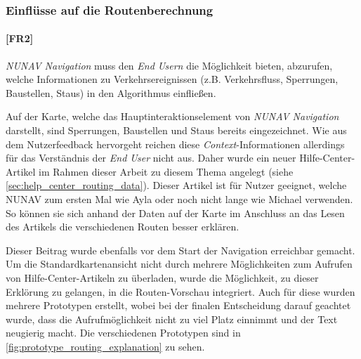 \subsubsection{Einflüsse auf die Routenberechnung}
\label{sec:route_explanation_definition}

\paragraph{[FR2]} \textit{NUNAV Navigation} muss den \textit{End Usern} die Möglichkeit bieten, abzurufen, welche Informationen zu Verkehrsereignissen (z.B. Verkehrsfluss, Sperrungen, Baustellen, Staus) in den Algorithmus einfließen.

\bigskip

Auf der Karte, welche das Hauptinteraktionselement von \textit{NUNAV Navigation} darstellt, sind Sperrungen, Baustellen und Staus bereits eingezeichnet. Wie aus dem Nutzerfeedback hervorgeht reichen diese \textit{Context}-Informationen allerdings für das Verständnis der \textit{End User} nicht aus. Daher wurde ein neuer Hilfe-Center-Artikel im Rahmen dieser Arbeit zu diesem Thema angelegt (siehe \autoref{sec:help_center_routing_data}). Dieser Artikel ist für Nutzer geeignet, welche NUNAV zum ersten Mal wie Ayla oder noch nicht lange wie Michael verwenden. So können sie sich anhand der Daten auf der Karte im Anschluss an das Lesen des Artikels die verschiedenen Routen besser erklären.

Dieser Beitrag wurde ebenfalls vor dem Start der Navigation erreichbar gemacht. Um die Standardkartenansicht nicht durch mehrere Möglichkeiten zum Aufrufen von Hilfe-Center-Artikeln zu überladen, wurde die Möglichkeit, zu dieser Erklörung zu gelangen, in die Routen-Vorschau integriert. Auch für diese wurden mehrere Prototypen erstellt, wobei bei der finalen Entscheidung darauf geachtet wurde, dass die Aufrufmöglichkeit nicht zu viel Platz einnimmt und der Text neugierig macht. Die verschiedenen Prototypen sind in \autoref{fig:prototype_routing_explanation} zu sehen.

